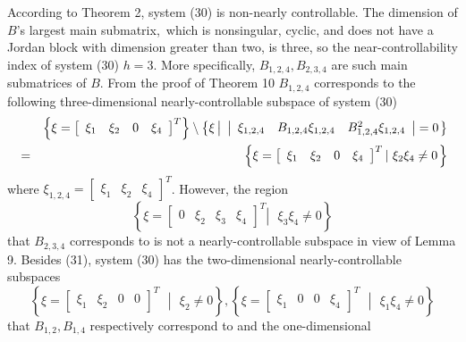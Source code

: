 \documentclass[journal,a4paper,12pt,onecolumn]{IEEEtran}
\begin{document}
According to Theorem 2, system (30) is non-nearly controllable. The
dimension of $B$'s largest main submatrix,\ which is nonsingular, cyclic,
and does not have a Jordan block with dimension greater than two, is three,
so the near-controllability index of system (30) $h=3$. More specifically, $B_{1,2,4},B_{2,3,4}$ are such main submatrices of $B$. From the proof of
Theorem 10 $B_{1,2,4}$ corresponds to the following three-dimensional
nearly-controllable subspace of system (30)\begin{eqnarray}
&&\left\{ \xi =\left[
\begin{array}{cccc}
\xi _{1} & \xi _{2} & 0 & \xi _{4}\end{array}\right] ^{T}\right\} \setminus \left\{ \xi \left\vert \text{ }\left\vert
\begin{array}{ccc}
\xi _{1,2,4} & B_{1,2,4}\xi _{1,2,4} & B_{1,2,4}^{2}\xi _{1,2,4}\end{array}\right\vert =0\right. \right\}  \notag \\
&=&\left\{ \xi =\left[
\begin{array}{cccc}
\xi _{1} & \xi _{2} & 0 & \xi _{4}\end{array}\right] ^{T}\left\vert \text{ }\xi _{2}\xi _{4}\neq 0\right. \right\}
\end{eqnarray}where $\xi _{1,2,4}=\left[
\begin{array}{ccc}
\xi _{1} & \xi _{2} & \xi _{4}\end{array}\right] ^{T}$. However, the region\begin{equation*}
\left\{ \xi =\left[
\begin{array}{cccc}
0 & \xi _{2} & \xi _{3} & \xi _{4}\end{array}\right] ^{T}\left\vert \text{ }\xi _{3}\xi _{4}\neq 0\right. \right\}
\end{equation*}that $B_{2,3,4}$ corresponds to is not a nearly-controllable subspace in
view of Lemma 9. Besides (31), system (30) has the two-dimensional
nearly-controllable subspaces\begin{equation*}
\left\{ \xi =\left[
\begin{array}{cccc}
\xi _{1} & \xi _{2} & 0 & 0\end{array}\right] ^{T}\text{ }\left\vert \text{ }\xi _{2}\neq 0\right. \right\} ,\text{
}\left\{ \xi =\left[
\begin{array}{cccc}
\xi _{1} & 0 & 0 & \xi _{4}\end{array}\right] ^{T}\text{ }\left\vert \text{ }\xi _{1}\xi _{4}\neq 0\right. \right\}
\end{equation*}that $B_{1,2},B_{1,4}$ respectively correspond to and the one-dimensional
\end{document}
